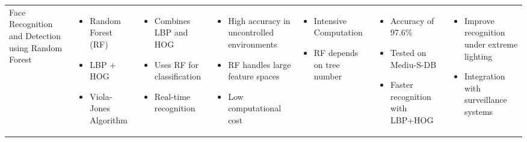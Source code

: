 \documentclass{article}
\begin{document}
\begin{adjustbox}{width=\textwidth}
\begin{tabular}{|p{}|p{}|p{}|p{}|p{}|p{}|p{}|}
    \hline
    Face Recognition and Detection using Random Forest & 
    \begin{itemize}[leftmargin=*]
        \item Random Forest (RF)
        \item LBP + HOG
        \item Viola-Jones Algorithm
    \end{itemize} & 
    \begin{itemize}[leftmargin=*]
        \item Combines LBP and HOG
        \item Uses RF for classification
        \item Real-time recognition
    \end{itemize} & 
    \begin{itemize}[leftmargin=*]
        \item High accuracy in uncontrolled environments
        \item RF handles large feature spaces
        \item Low computational cost
    \end{itemize} & 
    \begin{itemize}[leftmargin=*]
        \item Intensive Computation
        \item RF depends on tree number
    \end{itemize} & 
    \begin{itemize}[leftmargin=*]
        \item Accuracy of 97.6\%
        \item Tested on Mediu-S-DB
        \item Faster recognition with LBP+HOG
    \end{itemize} & 
    \begin{itemize}[leftmargin=*]
        \item Improve recognition under extreme lighting
        \item Integration with surveillance systems
    \end{itemize} \\


\end{tabular}
\end{adjustbox}
\end{document}
